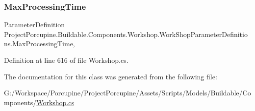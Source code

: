 \subsubsection{\texorpdfstring{Max\+Processing\+Time}{MaxProcessingTime}}
{\footnotesize\ttfamily \hyperlink{class_project_porcupine_1_1_buildable_1_1_components_1_1_buildable_component_1_1_parameter_definition}{Parameter\+Definition} Project\+Porcupine.\+Buildable.\+Components.\+Workshop.\+Work\+Shop\+Parameter\+Definitions.\+Max\+Processing\+Time\hspace{0.3cm}{\ttfamily [get]}, {\ttfamily [set]}}



Definition at line 616 of file Workshop.\+cs.



The documentation for this class was generated from the following file\+:\begin{DoxyCompactItemize}
\item 
G\+:/\+Workspace/\+Porcupine/\+Project\+Porcupine/\+Assets/\+Scripts/\+Models/\+Buildable/\+Components/\hyperlink{_workshop_8cs}{Workshop.\+cs}\end{DoxyCompactItemize}
